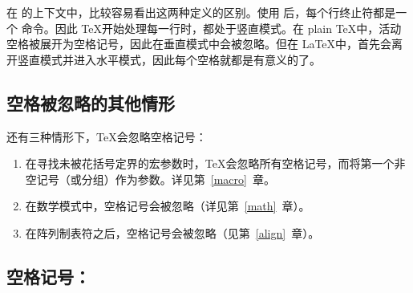 \documentclass{book}
\begin{document}
在  的上下文中，比较容易看出这两种定义的区别。使用  后，每个行终止符都是一个  命令。因此 \TeX 开始处理每一行时，都处于竖直模式。在 plain \TeX 中，活动空格被展开为空格记号，因此在垂直模式中会被忽略。但在 \LaTeX 中，首先会离开竖直模式并进入水平模式，因此每个空格就都是有意义的了。

\subsection{空格被忽略的其他情形}

还有三种情形下，\TeX 会忽略空格记号：
\alt
\begin{enumerate}
\item 在寻找未被花括号定界的宏参数时，\TeX 会忽略所有空格记号，而将第一个非空记号（或分组）作为参数。详见第~\ref{macro}~章。

\item 在数学模式中，空格记号会被忽略（详见第~\ref{math}~章）。

\item 在阵列制表符之后，空格记号会被忽略（见第~\ref{align}~章）。
\end{enumerate}

\subsection{空格记号：}
\end{document}
